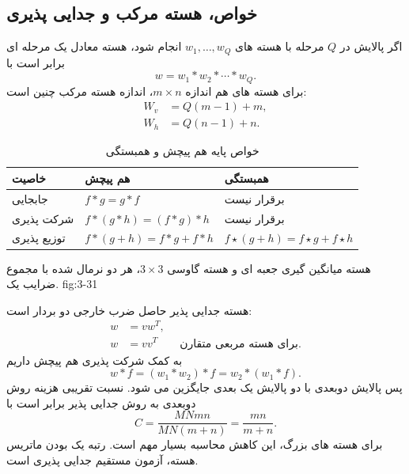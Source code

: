 \subsection{خواص، هسته مرکب و جدایی پذیری}

اگر پالایش در \(Q\) مرحله با هسته های \(w_1,\ldots,w_Q\) انجام شود، هسته
معادل یک مرحله ای برابر است با
\begin{equation}
  w=w_1*w_2*\cdots*w_Q.
  \tag{3-38}\label{eq:3-38}
\end{equation}
برای هسته های هم اندازه \(m\times n\)، اندازه هسته مرکب چنین است:
\begin{align}
  W_v&=Q(m-1)+m,
  \tag{3-39}\label{eq:3-39}\\
  W_h&=Q(n-1)+n.
  \tag{3-40}\label{eq:3-40}
\end{align}

\begin{table}[H]
\centering
\caption{خواص پایه هم پیچش و همبستگی}
\label{tab:3-5}
\begin{tabular}{p{}p{}p{}}
\toprule
خاصیت & هم پیچش & همبستگی\\
\midrule
جابجایی & \(f*g=g*f\) & برقرار نیست\\
شرکت پذیری & \(f*(g*h)=(f*g)*h\) & برقرار نیست\\
توزیع پذیری & \(f*(g+h)=f*g+f*h\) & \(f\star(g+h)=f\star g+f\star h\)\\
\bottomrule
\end{tabular}
\end{table}

{هسته میانگین گیری جعبه ای و هسته گاوسی \(3\times3\)، هر دو نرمال شده با
مجموع ضرایب یک.}
{fig:3-31}

هسته جدایی پذیر حاصل ضرب خارجی دو بردار است:
\begin{align}
  w&=vw^{T},
  \tag{3-41}\label{eq:3-41}\\
  w&=vv^{T}\qquad\text{برای هسته مربعی متقارن.}
  \tag{3-42}\label{eq:3-42}
\end{align}
به کمک شرکت پذیری هم پیچش داریم
\begin{equation}
w*f=(w_1*w_2)*f=w_2*(w_1*f).
\tag{3-43}\label{eq:3-43}
\end{equation}
پس پالایش دوبعدی با دو پالایش یک بعدی جایگزین می شود. نسبت تقریبی هزینه روش
دوبعدی به روش جدایی پذیر برابر است با
\begin{equation}
  C=\frac{MNmn}{MN(m+n)}=\frac{mn}{m+n}.
  \tag{3-44}\label{eq:3-44}
\end{equation}
برای هسته های بزرگ، این کاهش محاسبه بسیار مهم است. رتبه یک بودن ماتریس هسته،
آزمون مستقیم جدایی پذیری است.

